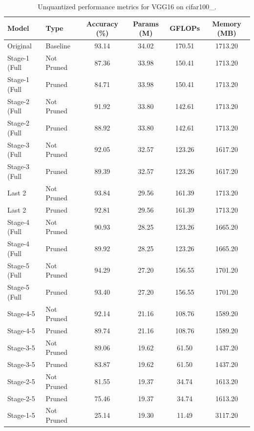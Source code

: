 \begin{table}
\caption{Unquantized performance metrics for VGG16 on cifar100_.}
\label{tab:VGG16_cifar100__unquant}
\begin{tabular}{llcccc}
\toprule
Model & Type & Accuracy (\%) & Params (M) & GFLOPs & Memory (MB) \\
\midrule
Original & Baseline & 93.14 & 34.02 & 170.51 & 1713.20 \\
Stage-1 (Full & Not Pruned & 87.36 & 33.98 & 150.41 & 1713.20 \\
Stage-1 (Full & Pruned & 84.71 & 33.98 & 150.41 & 1713.20 \\
Stage-2 (Full & Not Pruned & 91.92 & 33.80 & 142.61 & 1713.20 \\
Stage-2 (Full & Pruned & 88.92 & 33.80 & 142.61 & 1713.20 \\
Stage-3 (Full & Not Pruned & 92.05 & 32.57 & 123.26 & 1617.20 \\
Stage-3 (Full & Pruned & 89.39 & 32.57 & 123.26 & 1617.20 \\
Last 2 & Not Pruned & 93.84 & 29.56 & 161.39 & 1713.20 \\
Last 2 & Pruned & 92.81 & 29.56 & 161.39 & 1713.20 \\
Stage-4 (Full & Not Pruned & 90.93 & 28.25 & 123.26 & 1665.20 \\
Stage-4 (Full & Pruned & 89.92 & 28.25 & 123.26 & 1665.20 \\
Stage-5 (Full & Not Pruned & 94.29 & 27.20 & 156.55 & 1701.20 \\
Stage-5 (Full & Pruned & 93.40 & 27.20 & 156.55 & 1701.20 \\
Stage-4-5 & Not Pruned & 92.14 & 21.16 & 108.76 & 1589.20 \\
Stage-4-5 & Pruned & 89.74 & 21.16 & 108.76 & 1589.20 \\
Stage-3-5 & Not Pruned & 89.06 & 19.62 & 61.50 & 1437.20 \\
Stage-3-5 & Pruned & 83.87 & 19.62 & 61.50 & 1437.20 \\
Stage-2-5 & Not Pruned & 81.55 & 19.37 & 34.74 & 1613.20 \\
Stage-2-5 & Pruned & 75.46 & 19.37 & 34.74 & 1613.20 \\
Stage-1-5 & Not Pruned & 25.14 & 19.30 & 11.49 & 3117.20 \\
\bottomrule
\end{tabular}
\end{table}
